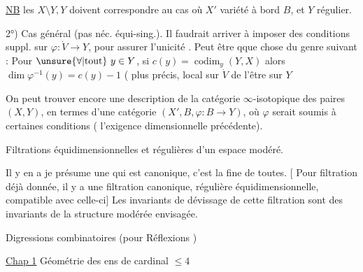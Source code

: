 \uline{NB} les $X\setminus Y,Y$
doivent correspondre au cas où
$X'$ variété à bord $B$, et $Y$ régulier.


2°) Cas général (pas néc. équi-sing.).
Il faudrait arriver à imposer des
conditions suppl. sur $\varphi:\dot V\longrightarrow Y$,
pour assurer l'unicité .
Peut être qque chose du genre
suivant : Pour $\unsure{\forall|\text{tout}}\ y\in Y$, si $c(y)=\operatorname{codim}_y(Y,X)$
alors $\dim\varphi^{-1}(y)=c(y)-1$
( plus précis, local sur $\dot V$  de l'être sur $Y$


On peut  trouver encore une
description de la catégorie $\infty$-isotopique
des paires  $(X,Y)$, en termes
d'une catégorie $(X',B,\varphi:B\longrightarrow Y)$, où
$\varphi$ serait soumis à certaines conditions
(  l'exigence dimensionnelle
précédente).


Filtrations équidimensionnelles et
régulières d'un espace modéré.

Il y en a je présume une qui
est canonique, c'est la  fine
de toutes. [ Pour  filtration
déjà donnée, il y a une filtration
 canonique, régulière
équidimensionnelle, compatible
avec celle-ci] Les invariants de
dévissage de cette filtration sont 
des invariants de la structure
modérée envisagée.


Digressions combinatoires (pour Réflexions )

\uline{Chap 1} Géométrie des ens de cardinal $\leq4$


